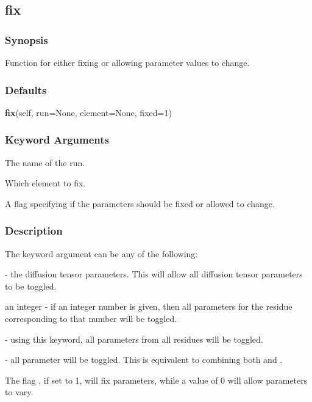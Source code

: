 \newpage

\subsection{fix}


\subsubsection{Synopsis}

Function for either fixing or allowing parameter values to change.



\subsubsection{Defaults}

\textsf{\textbf{fix}(self, run=None, element=None, fixed=1)}


\subsubsection{Keyword Arguments}

  The name of the run. 

  Which element to fix. 

  A flag specifying if the parameters should be fixed or allowed to change. 




\subsubsection{Description}

The keyword argument  can be any of the following:


 - the diffusion tensor parameters.  This will allow all diffusion tensor parameters to be toggled.


an integer - if an integer number is given, then all parameters for the residue corresponding to that number will be toggled.


 - using this keyword, all parameters from all residues will be toggled.


 - all parameter will be toggled.  This is equivalent to combining both  and .


The flag , if set to 1, will fix parameters, while a value of 0 will allow parameters to vary.


